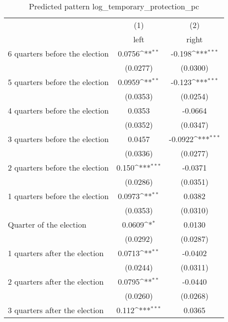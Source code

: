 \begin{table}[htbp]\centering
\def\sym#1{\ifmmode^{#1}\else\(^{#1}\)\fi}
\caption{Predicted pattern log\_temporary\_protection\_pc}
\begin{tabular}{l*{2}{c}}
\hline\hline
                    &\multicolumn{1}{c}{(1)}&\multicolumn{1}{c}{(2)}\\
                    &\multicolumn{1}{c}{left}&\multicolumn{1}{c}{right}\\
\hline
 6 quarters before the election&      0.0756\sym{**} &      -0.198\sym{***}\\
                    &    (0.0277)         &    (0.0300)         \\
[1em]
 5 quarters before the election&      0.0959\sym{**} &      -0.123\sym{***}\\
                    &    (0.0353)         &    (0.0254)         \\
[1em]
 4 quarters before the election&      0.0353         &     -0.0664         \\
                    &    (0.0352)         &    (0.0347)         \\
[1em]
 3 quarters before the election&      0.0457         &     -0.0922\sym{***}\\
                    &    (0.0336)         &    (0.0277)         \\
[1em]
 2 quarters before the election&       0.150\sym{***}&     -0.0371         \\
                    &    (0.0286)         &    (0.0351)         \\
[1em]
 1 quarters before the election&      0.0973\sym{**} &      0.0382         \\
                    &    (0.0353)         &    (0.0310)         \\
[1em]
Quarter of the election&      0.0609\sym{*}  &      0.0130         \\
                    &    (0.0292)         &    (0.0287)         \\
[1em]
 1 quarters after the election&      0.0713\sym{**} &     -0.0402         \\
                    &    (0.0244)         &    (0.0311)         \\
[1em]
 2 quarters after the election&      0.0795\sym{**} &     -0.0440         \\
                    &    (0.0260)         &    (0.0268)         \\
[1em]
 3 quarters after the election&       0.112\sym{***}&      0.0365         \\

\end{tabular}
\end{table}

